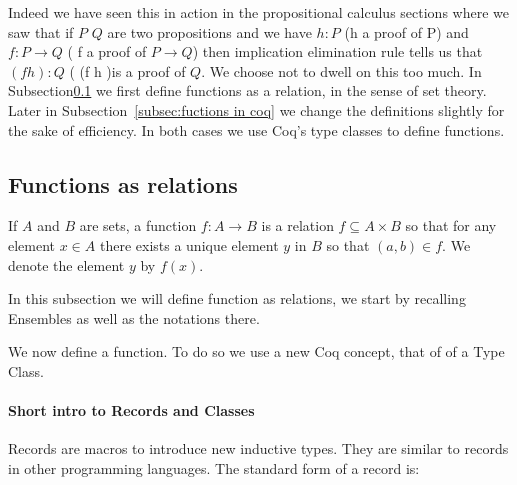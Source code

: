  Indeed we have seen this in action in the propositional calculus sections where we saw that if $P$ $Q$   are two propositions and we have $h:P$ (h a proof of P) and $f:P\rightarrow Q$ ( f a proof of $P\rightarrow Q$) then implication elimination rule tells us that $(f h):Q$ ( (f h )is a proof of $Q$. 
 We choose not to dwell on this too much. In Subsection\ref{subsec:fuctions as relation} we first define functions as a relation, in the sense of set theory. Later in Subsection~\ref{subsec:fuctions in coq} we change the definitions  slightly for the sake of efficiency. In both cases we use Coq's type classes to define functions. 
 
 \subsection{Functions as relations}\label{subsec:fuctions as relation}
 
 \begin{definition}
 If $A$ and $B$  are sets, a function $f:A \rightarrow B$ is a relation $f\subseteq A\times B$ so that for any element $x\in A$ there exists a unique element $y$ in $B$ so that $ (a, b) \in f$. We denote the element $y$ by $f(x)$.
 \end{definition}
 
 
In this subsection we will define function as relations, we start by recalling Ensembles as well as the notations there.
 
 


We now define a function. To do so we use a new Coq concept, that of of a Type Class. 

\paragraph{\bf Short intro to Records and Classes}
Records are macros to introduce new inductive types. They are similar to records in other programming languages. The standard form of a record is:



